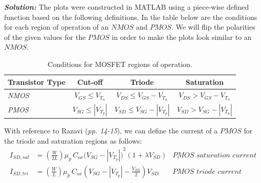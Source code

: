\documentclass[12pt, fleqn]{article}
\begin{document}
\newpage\noindent
\textbf{\emph{Solution:}}
        The plots were constructed in MATLAB using a piece-wise defined function based on the following definitions.
        In the table below are the conditions for each region of operation of an $NMOS$ and $PMOS$.  We will flip the polarities of the given values for the $PMOS$ in order to make the plots look similar to an $NMOS$.
        \begin{table}[H]
        \centering
        \setlength{\tabcolsep}{20pt}
        \renewcommand{\arraystretch}{1.5}
        \begin{tabular}{|l|c|c|c|}
            \hline
            \textbf{Transistor Type}  &  \textbf{Cut-off} & \textbf{Triode} & \textbf{Saturation}\\
            \hline
            \textit{NMOS} & $V_{GS} \leq V_{T_n}$
                            & $V_{DS} \leq V_{GS} - V_{T_n}$
                            & $V_{DS} > V_{GS} - V_{T_n}$\\
            \hline
            \textit{PMOS} & $V_{SG} \leq \left|V_{T_p}\right|$
                            & $V_{SD} \leq V_{SG} - \left|V_{T_p}\right|$
                            & $V_{SD} > V_{SG} - \left|V_{T_p}\right|$\\
            \hline
        \end{tabular}
        \caption{Conditions for MOSFET regions of operation.
        \label{tab:imp}} 
        \end{table}
        With reference to Razavi\cite{raz} (\textit{pp. 14-15}), we can define the current of a $PMOS$ for the triode and saturation regions as follows:
        \begin{align}
           I_{SD,sat} &= \left(\frac{W}{2L}\right) \mu_p\,C_{ox}
                             {\big(V_{SG} - \left|V_{T_p}\right|\big)}^2 (1 + \lambda V_{SD})
            &\textit{$PMOS$ saturation current}
            \label{eq:mosfet_ids_pmos}\\[0.25cm]
            I_{SD,tri} &= \left(\frac{W}{L}\right) \mu_p\,C_{ox} \left(V_{SG} - \left|V_{T_p}\right| - \frac{V_{SD}}{2}\right) V_{SD}
            &\textit{$PMOS$ triode current}
            \label{eq:mosfet_ids_pmos_tri}
        \end{align}
\end{document}
